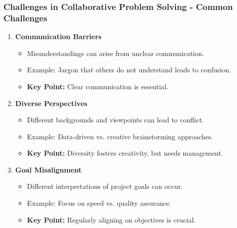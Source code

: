 \documentclass{beamer}
\begin{document}
\begin{frame}[fragile]
    \frametitle{Challenges in Collaborative Problem Solving - Common Challenges}
    \begin{enumerate}
        \item \textbf{Communication Barriers}
            \begin{itemize}
                \item Misunderstandings can arise from unclear communication.
                \item Example: Jargon that others do not understand leads to confusion.
                \item \textbf{Key Point:} Clear communication is essential.
            \end{itemize}
        
        \item \textbf{Diverse Perspectives}
            \begin{itemize}
                \item Different backgrounds and viewpoints can lead to conflict.
                \item Example: Data-driven vs. creative brainstorming approaches.
                \item \textbf{Key Point:} Diversity fosters creativity, but needs management.
            \end{itemize}
        
        \item \textbf{Goal Misalignment}
            \begin{itemize}
                \item Different interpretations of project goals can occur.
                \item Example: Focus on speed vs. quality assurance.
                \item \textbf{Key Point:} Regularly aligning on objectives is crucial.
            \end{itemize}
    \end{enumerate}
\end{frame}
\end{document}
